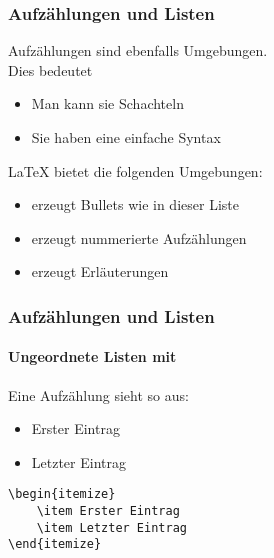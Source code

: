 \begin{frame}
    \frametitle{Aufzählungen und Listen}

    Aufzählungen sind ebenfalls Umgebungen.\\
    Dies bedeutet
    \begin{itemize}
        \item Man kann sie Schachteln
        \item Sie haben eine einfache Syntax
    \end{itemize}
    
    \bigskip\pause
    \LaTeX{} bietet die folgenden Umgebungen:
    \begin{itemize}
        \item {} erzeugt Bullets wie in dieser Liste\pause
        \item {} erzeugt nummerierte Aufzählungen\pause
        \item {} erzeugt Erläuterungen
    \end{itemize}
\end{frame}


\begin{frame}[fragile]
    \frametitle{Aufzählungen und Listen}
    \framesubtitle{Ungeordnete Listen mit }
    
    Eine Aufzählung sieht so aus:
    \begin{itemize}
        \item Erster Eintrag
        \item Letzter Eintrag
    \end{itemize}
    
    \bigskip\pause
\begin{codeblock}
\begin{verbatim}
\begin{itemize}
    \item Erster Eintrag
    \item Letzter Eintrag
\end{itemize}
\end{verbatim}
\end{codeblock}
\end{frame}


